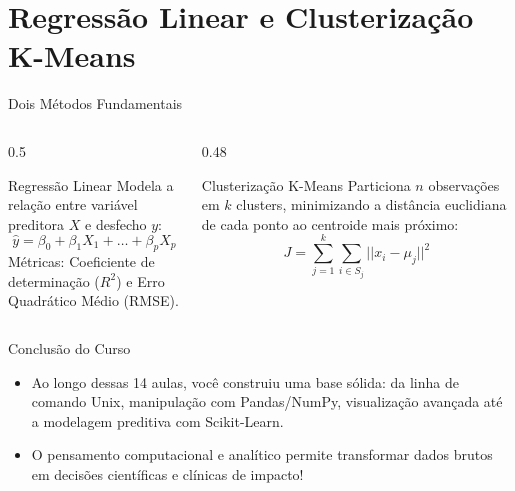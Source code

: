 \documentclass[aspectratio=169, 10pt]{beamer}
\begin{document}
\section{Regressão Linear e Clusterização K-Means}

\begin{frame}{Dois Métodos Fundamentais}
  \begin{columns}
    \begin{column}{0.5\textwidth}
      \begin{block}{Regressão Linear}
        Modela a relação entre variável preditora $X$ e desfecho $y$:
        $$\hat{y} = \beta_0 + \beta_1 X_1 + \dots + \beta_p X_p$$
        Métricas: Coeficiente de determinação ($R^2$) e Erro Quadrático Médio (RMSE).
      \end{block}
    \end{column}
    \begin{column}{0.48\textwidth}
      \begin{block}{Clusterização K-Means}
        Particiona $n$ observações em $k$ clusters, minimizando a distância euclidiana de cada ponto ao centroide mais próximo:
        $$J = \sum_{j=1}^{k} \sum_{i \in S_j} ||x_i - \mu_j||^2$$
      \end{block}
    \end{column}
  \end{columns}
\end{frame}

\begin{frame}{Conclusão do Curso}
  \begin{itemize}
    \item Ao longo dessas 14 aulas, você construiu uma base sólida: da linha de comando Unix, manipulação com Pandas/NumPy, visualização avançada até a modelagem preditiva com Scikit-Learn.
    \item O pensamento computacional e analítico permite transformar dados brutos em decisões científicas e clínicas de impacto!
  \end{itemize}
\end{frame}
\end{document}
